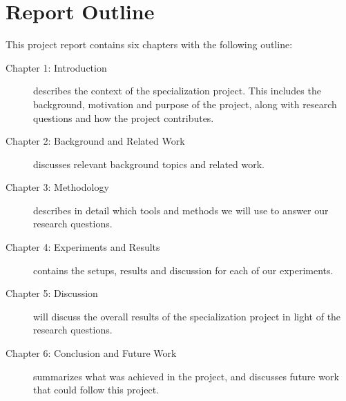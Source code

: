 \section{Report Outline} %
This project report contains six chapters with the following outline:

\begin{description}
    \item[Chapter 1: Introduction] describes the context of the specialization project. This includes the background, motivation and purpose of the project, along with research questions and how the project contributes.
    \item[Chapter 2: Background and Related Work] discusses relevant background topics and related work.
    \item[Chapter 3: Methodology] describes in detail which tools and methods we will use to answer our research questions.
    \item[Chapter 4: Experiments and Results] contains the setups, results and discussion for each of our experiments.
    \item[Chapter 5: Discussion] will discuss the overall results of the specialization project in light of the research questions.
    \item[Chapter 6: Conclusion and Future Work] summarizes what was achieved in the project, and discusses future work that could follow this project.
\end{description}
